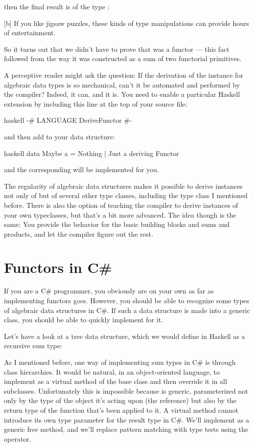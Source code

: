then the final result is of the type
:

[b]
If you like jigsaw puzzles, these kinds of type manipulations can
provide hours of entertainment.

So it turns out that we didn't have to prove that  was a
functor --- this fact followed from the way it was constructed as a sum
of two functorial primitives.

A perceptive reader might ask the question: If the derivation of the
 instance for algebraic data types is so mechanical,
can't it be automated and performed by the compiler? Indeed, it can, and
it is. You need to enable a particular Haskell extension by including
this line at the top of your source file:

\begin{snip}{haskell}
{-# LANGUAGE DeriveFunctor #-}
\end{snip}
and then add  to your data structure:

\begin{snip}{haskell}
data Maybe a = Nothing | Just a deriving Functor
\end{snip}
and the corresponding  will be implemented for you.

The regularity of algebraic data structures makes it possible to derive
instances not only of  but of several other type
classes, including the  type class I mentioned before. There
is also the option of teaching the compiler to derive instances of your
own typeclasses, but that's a bit more advanced. The idea though is the
same: You provide the behavior for the basic building blocks and sums
and products, and let the compiler figure out the rest.

\section{Functors in C\#}

If you are a C\# programmer, you obviously are on your own as far as
implementing functors goes. However, you should be able to recognize
some types of algebraic data structures in C\#. If such a data structure
is made into a generic class, you should be able to quickly implement
 for it.

Let's have a look at a tree data structure, which we would define in
Haskell as a recursive sum type:

As I mentioned before, one way of implementing sum types in C\# is
through class hierarchies. It would be natural, in an object-oriented
language, to implement  as a virtual method of the base
class  and then override it in all subclasses.
Unfortunately this is impossible because  is generic,
parameterized not only by the type of the object it's acting upon (the
 reference) but also by the return type of the function
that's been applied to it. A virtual method cannot introduce its own
type parameter for the result type in
C\#. We'll implement  as a generic free method, and we'll
replace pattern matching with type tests using the  operator.

